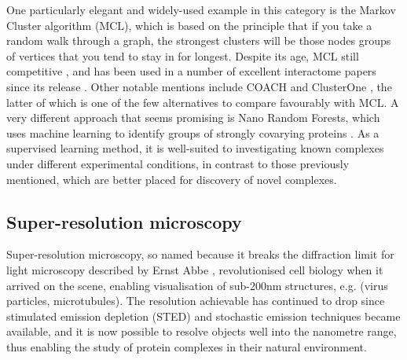 \documentclass[a4paper,11pt,twoside,openright]{scrbook}
\begin{document}
One particularly elegant and widely-used example in this category is the Markov Cluster algorithm \cite{VanDongen2000} (MCL), which is based on the principle that if you take a random walk through a graph, the strongest clusters will be those nodes groups of vertices that you tend to stay in for longest. Despite its age, MCL still competitive \cite{Li2010}, and has been used in a number of excellent interactome papers since its release \cite{Krogan2006,Wan2015}. Other notable mentions include COACH and ClusterOne \cite{Wu2009,Nepusz2012}, the latter of which is one of the few alternatives to compare favourably with MCL. A very different approach that seems promising is Nano Random Forests, which uses machine learning to identify groups of strongly covarying proteins \cite{Montano-Gutierrez2017}. As a supervised learning method, it is well-suited to investigating known complexes under different experimental conditions, in contrast to those previously mentioned, which are better placed for discovery of novel complexes.

\subsection{Super-resolution microscopy}
Super-resolution microscopy, so named because it breaks the diffraction limit for light microscopy described by Ernst Abbe \cite{Abbe1873}, revolutionised cell biology when it arrived on the scene, enabling visualisation of sub-200nm structures, e.g. (virus particles, microtubules). The resolution achievable has continued to drop since stimulated emission depletion \cite{Hell1994} (STED) and stochastic emission techniques \cite{Rust2006,Hess2006,Betzig2006} became available, and it is now possible to resolve objects well into the nanometre range, thus enabling the study of protein complexes in their natural environment.
\end{document}
